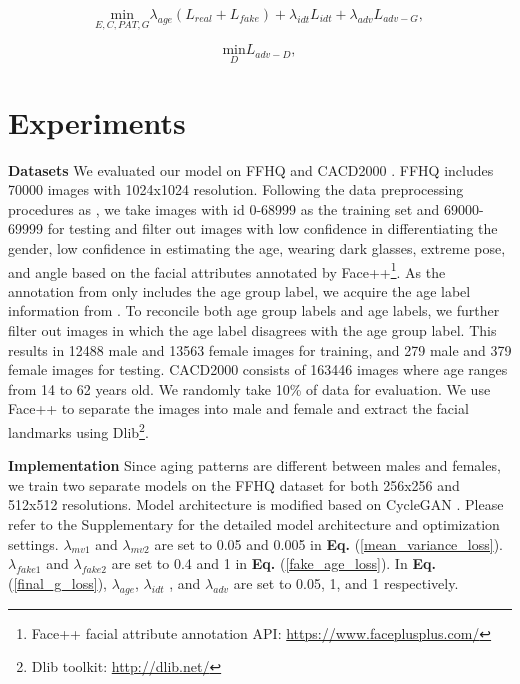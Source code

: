\documentclass[final]{cvpr}
\begin{document}
\begin{equation}
\underset{E, C, PAT, G}{\text{min}} \lambda_{age} (L_{real} + L_{fake}) + \lambda_{idt} L_{idt} + \lambda_{adv} L_{adv-G},
\label{final_g_loss}
\end{equation}

\begin{equation}
\underset{D}{\text{min}} L_{adv-D},
\label{final_d_loss}
\end{equation}


\section{Experiments}

\textbf{Datasets}
We evaluated our model on FFHQ \cite{karras2019style} and CACD2000 \cite{chen2014cross}. FFHQ includes 70000 images with 1024x1024 resolution. Following the data preprocessing procedures as \cite{orel2020lifespan}, we take images with id 0-68999 as the training set and 69000-69999 for testing and filter out images with low confidence in differentiating the gender, low confidence in estimating the age, wearing dark glasses, extreme pose, and angle based on the facial attributes annotated by Face++\footnote{Face++ facial attribute annotation API: \url{https://www.faceplusplus.com/}}. As the annotation from \cite{orel2020lifespan} only includes the age group label, we acquire the age label information from \cite{yao2020high}. To reconcile both age group labels and age labels, we further filter out images in which the age label disagrees with the age group label. This results in 12488 male and 13563 female images for training, and 279 male and 379 female images for testing. CACD2000 consists of 163446 images where age ranges from 14 to 62 years old. We randomly take 10\% of data for evaluation. We use Face++ to separate the images into male and female and extract the facial landmarks using Dlib\footnote{Dlib toolkit: \url{http://dlib.net/}}.

\textbf{Implementation}
Since aging patterns are different between males and females, we train two separate models on the FFHQ dataset for both 256x256 and 512x512 resolutions. Model architecture is modified based on CycleGAN \cite{zhu2017unpaired}. Please refer to the Supplementary for the detailed model architecture and optimization settings. $\lambda_{mv1}$ and $\lambda_{mv2}$ are set to 0.05 and 0.005 in \textbf{Eq.} (\ref{mean_variance_loss}). $\lambda_{fake1}$ and $\lambda_{fake2}$ are set to 0.4 and 1 in \textbf{Eq.} (\ref{fake_age_loss}). In \textbf{Eq.} (\ref{final_g_loss}), $\lambda_{age}$, $\lambda_{idt}$ , and $\lambda_{adv}$ are set to 0.05, 1, and 1 respectively. 
\end{document}
